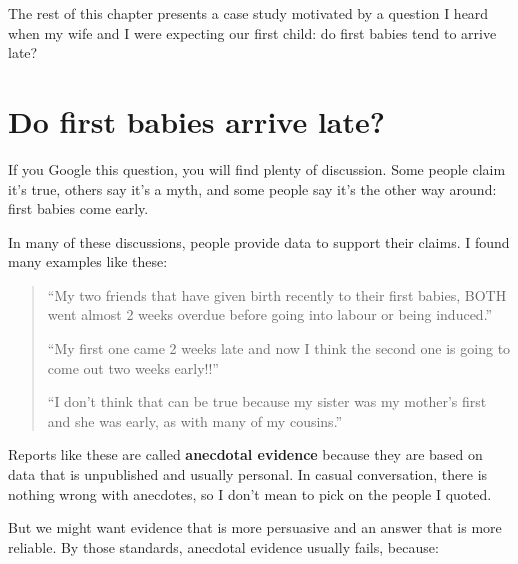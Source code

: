 \documentclass[12pt]{book}
\begin{document}
The rest of this chapter presents a case study motivated by a question
I heard when my wife and I were expecting our first child: do first
babies tend to arrive late?

\section{Do first babies arrive late?}

If you Google this question, you will find plenty of discussion.
Some people claim it's true, others say it's a myth, and some people
say it's the other way around: first babies come early.

In many of these discussions, people provide data to support their
claims.  I found many examples like these:

\begin{quote}

``My two friends that have given birth recently to their first babies,
BOTH went almost 2 weeks overdue before going into labour or being
induced.''

``My first one came 2 weeks late and now I think the second one is
going to come out two weeks early!!''

``I don't think that can be true because my sister was my mother's
first and she was early, as with many of my cousins.''

\end{quote}

Reports like these are called {\bf anecdotal evidence} because they
are based on data that is unpublished and usually personal.  In casual
conversation, there is nothing wrong with anecdotes, so I don't mean
to pick on the people I quoted.

But we might want evidence that is more persuasive and
an answer that is more reliable.  By those standards, anecdotal
evidence usually fails, because:
\end{document}
